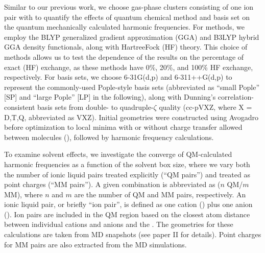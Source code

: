 Similar to our previous work\cite{Brinzer2015}, we choose gas-phase clusters consisting of one \ce{[C4C1im][PF6]} ion pair with  to quantify the effects of quantum chemical method and basis set on the quantum mechanically calculated harmonic frequencies. For methods, we employ the BLYP\cite{Becke1988,Lee1988} generalized gradient approximation (GGA) and B3LYP\cite{Becke1993,Stephens1994} hybrid GGA density functionals, along with Hartree\textendash{}Fock (HF) theory. This choice of methods allows us to test the dependence of the results on the percentage of exact (HF) exchange, as these methods have 0\%, 20\%, and 100\% HF exchange, respectively. For basis sets, we choose 6-31G(d,p)\cite{Hehre1972,Francl1982} and 6-311++G(d,p)\cite{Krishnan1980,McLean1980,Clark1983} to represent the commonly-used Pople-style basis sets (abbreviated as ``small Pople'' [SP] and ``large Pople'' [LP] in the following), along with Dunning's correlation-consistent basis sets from double- to quadruple-\(\zeta\) quality (cc-pVXZ, where X = D,T,Q, abbreviated as VXZ)\cite{Dunning1989,Dunning1993}. Initial geometries were constructed using Avogadro\cite{Hanwell2012,Avogadro} before optimization to local minima with or without charge transfer allowed between molecules (), followed by harmonic frequency calculations.

To examine solvent effects, we investigate the converge of QM-calculated harmonic frequencies as a function of the solvent box size, where we vary both the number of ionic liquid pairs treated explicitly (``QM pairs'') and treated as point charges (``MM pairs''). A given combination is abbreviated as (\(n\) QM/\(m\) MM), where \(n\) and \(m\) are the number of QM and MM pairs, respectively. An ionic liquid pair, or briefly ``ion pair'', is defined as one cation (\ce{[C4C1im]+}) plus one anion (\ce{[PF6]-}). Ion pairs are included in the QM region based on the closest atom distance between individual cations and anions and the . The geometries for these calculations are taken from MD snapshots (see paper II\cite{Daly2016} for details). Point charges for MM pairs are also extracted from the MD simulations.

